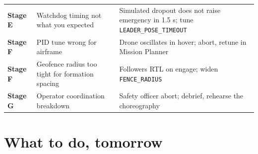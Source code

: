 \documentclass[11pt,a4paper]{article}
\begin{document}
\begin{center}
\begin{tabularx}{16cm}{p{2.5cm}p{5cm}X}
\textbf{Stage E} & Watchdog timing not what you expected & Simulated dropout does not raise emergency in 1.5 s; tune \texttt{LEADER\_POSE\_TIMEOUT} \\
\textbf{Stage F} & PID tune wrong for airframe & Drone oscillates in hover; abort, retune in Mission Planner \\
\textbf{Stage F} & Geofence radius too tight for formation spacing & Followers RTL on engage; widen \texttt{FENCE\_RADIUS} \\
\textbf{Stage G} & Operator coordination breakdown & Safety officer abort; debrief, rehearse the choreography \\
\bottomrule
\end{tabularx}
\end{center}

\newpage

\section{What to do, tomorrow}
\end{document}
